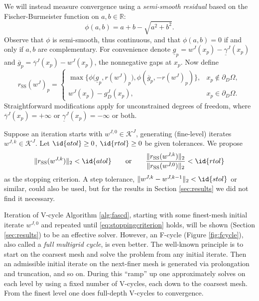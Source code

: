 \documentclass[letterpaper,final,12pt,reqno]{amsart}
\theoremstyle{cstyle}
\theoremstyle{cstyle*}
\theoremstyle{dstyle}
\numberwithin{equation}{section}
\numberwithin{figure}{section}
\numberwithin{table}{section}
\numberwithin{theorem}{section}
\newcommand{\RR}{\mathbb{R}}
\newcommand{\rSS}{r_{\text{SS}}}
\begin{document}
We will instead measure convergence using a \emph{semi-smooth residual} based on the Fischer-Burmeister function \cite{BensonMunson2006,Ulbrich2011} on $a,b\in\RR$:
\begin{equation}
\phi(a,b) = a + b - \sqrt{a^2 + b^2}. \label{eq:phiFB}
\end{equation}
Observe that $\phi$ is semi-smooth, thus continuous, and that $\phi(a,b)=0$ if and only if $a,b$ are complementary.  For convenience denote $\underline{g}_p = w^J(x_p) - \underline{\gamma}^J(x_p)$ and $\overline{g}_p = \overline{\gamma}^J(x_p) - w^J(x_p)$, the nonnegative gaps at $x_p$.  Now define
\begin{equation}
\rSS(w^J)_p = \begin{cases}
\max\big\{\phi\big(\underline{g}_p, r(w^J)_p\big), \phi\left(\overline{g}_p, -r(w^J)_p\right)\big\}, & x_p \notin \partial_D\Omega, \\
w^J(x_p) - g_D^J(x_p), & x_p \in \partial_D\Omega.
\end{cases} \label{eq:rSS}
\end{equation}
Straightforward modifications apply for unconstrained degrees of freedom, where $\overline{\gamma}^J(x_p) = +\infty$ or $\underline{\gamma}^J(x_p) = -\infty$ or both.

Suppose an iteration starts with $w^{J,0} \in \mathcal{K}^J$, generating (fine-level) iterates $w^{J,k} \in \mathcal{K}^J$.  Let $\id{atol}\ge 0$, $\id{rtol}\ge 0$ be given tolerances.  We propose
\begin{equation}
\|\rSS(w^{J,k})\|_2 < \id{atol} \qquad \text{or} \qquad \frac{\|\rSS(w^{J,k})\|_2}{\|\rSS(w^{J,0})\|_2} < \id{rtol} \label{eq:stoppingcriterion}
\end{equation}
as the stopping criterion.  A step tolerance, $\|w^{J,k} - w^{J,k-1}\|_2 < \id{stol}$ or similar, could also be used, but for the results in Section \ref{sec:results} we did not find it necessary.

Iteration of V-cycle Algorithm \ref{alg:fascd}, starting with some finest-mesh initial iterate $w^{J,0}$ and repeated until \eqref{eq:stoppingcriterion} holds, will be shown (Section \ref{sec:results}) to be an effective solver.  However, an F-cycle (Figure \ref{fig:fcycle}), also called a \emph{full multigrid cycle}, is even better.  The well-known principle \cite[section 2.6]{Trottenbergetal2001} is to start on the coarsest mesh and solve the problem from any initial iterate.  Then an admissible initial iterate on the next-finer mesh is generated via prolongation and truncation, and so on.  During this ``ramp'' up one approximately solves on each level by using a fixed number of V-cycles, each down to the coarsest mesh.  From the finest level one does full-depth V-cycles to convergence.
\end{document}
